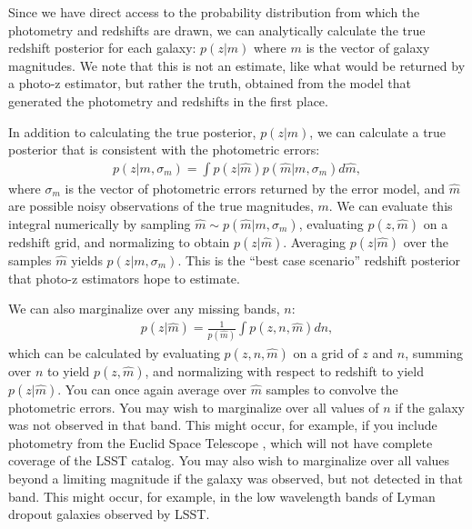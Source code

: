 \documentclass[twocolumn,twocolappendix,linenumbers]{aastex631}
\begin{document}
Since we have direct access to the probability distribution from which the photometry and redshifts are drawn, we can analytically calculate the true redshift posterior for each galaxy: $p(z|m)$ where $m$ is the vector of galaxy magnitudes.
We note that this is not an estimate, like what would be returned by a photo-z estimator, but rather the truth, obtained from the model that generated the photometry and redshifts in the first place.

In addition to calculating the true posterior, $p(z|m)$, we can calculate a true posterior that is consistent with the photometric errors:
\begin{align}
    p(z|m, \sigma_m) = \int p(z|\hat{m}) p(\hat{m}|m, \sigma_m) d\hat{m},
    \label{eq:err-conv}
\end{align}
where $\sigma_m$ is the vector of photometric errors returned by the error model, and $\hat{m}$ are possible noisy observations of the true magnitudes, $m$.
We can evaluate this integral numerically by sampling $\hat{m} \sim p(\hat{m}|m, \sigma_m)$, evaluating $p(z, \hat{m})$ on a redshift grid, and normalizing to obtain $p(z|\hat{m})$.
Averaging $p(z|\hat{m})$ over the samples $\hat{m}$ yields $p(z|m, \sigma_m)$.
This is the ``best case scenario'' redshift posterior that photo-z estimators hope to estimate.

We can also marginalize over any missing bands, $n$:
\begin{align}
    p(z|\hat{m}) = \frac{1}{p(\hat{m})} \int p(z, n, \hat{m}) dn,
\end{align}
which can be calculated by evaluating $p(z, n, \hat{m})$ on a grid of $z$ and $n$, summing over $n$ to yield $p(z, \hat{m})$, and normalizing with respect to redshift to yield $p(z|\hat{m})$.
You can once again average over $\hat{m}$ samples to convolve the photometric errors.
You may wish to marginalize over all values of $n$ if the galaxy was not observed in that band.
This might occur, for example, if you include photometry from the Euclid Space Telescope \citep{euclid}, which will not have complete coverage of the LSST catalog.
You may also wish to marginalize over all values beyond a limiting magnitude if the galaxy was observed, but not detected in that band.
This might occur, for example, in the low wavelength bands of Lyman dropout galaxies observed by LSST.
\end{document}
